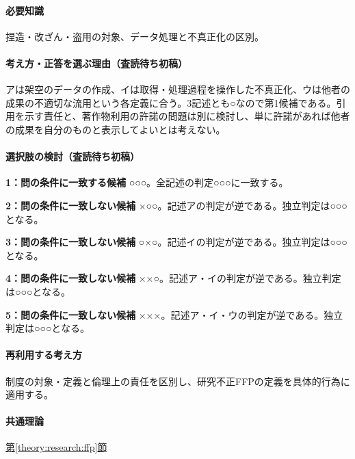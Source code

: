 \paragraph{必要知識} 捏造・改ざん・盗用の対象、データ処理と不真正化の区別。

\paragraph{考え方・正答を選ぶ理由（査読待ち初稿）} アは架空のデータの作成、イは取得・処理過程を操作した不真正化、ウは他者の成果の不適切な流用という各定義に合う。3記述とも○なので第1候補である。引用を示す責任と、著作物利用の許諾の問題は別に検討し、単に許諾があれば他者の成果を自分のものと表示してよいとは考えない。

\paragraph{選択肢の検討（査読待ち初稿）}\mbox{}\par

\noindent\textbf{1：問の条件に一致する候補} ○○○。全記述の判定○○○に一致する。\par

\noindent\textbf{2：問の条件に一致しない候補} ×○○。記述アの判定が逆である。独立判定は○○○となる。\par

\noindent\textbf{3：問の条件に一致しない候補} ○×○。記述イの判定が逆である。独立判定は○○○となる。\par

\noindent\textbf{4：問の条件に一致しない候補} ××○。記述ア・イの判定が逆である。独立判定は○○○となる。\par

\noindent\textbf{5：問の条件に一致しない候補} ×××。記述ア・イ・ウの判定が逆である。独立判定は○○○となる。\par

\paragraph{再利用する考え方} 制度の対象・定義と倫理上の責任を区別し、研究不正FFPの定義を具体的行為に適用する。

\paragraph{共通理論} \hyperref[theory:research:ffp]{第\ref*{theory:research:ffp}節}

